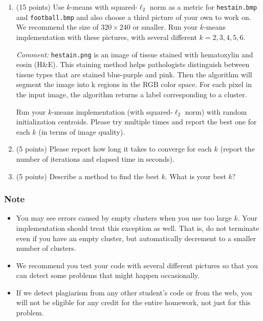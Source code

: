 \documentclass[twoside,10pt]{article}
\begin{document}
\begin{enumerate}
 
\item  (15 points) Use $k$-means with squared-$\ell_2$ norm as a metric for \texttt{hestain.bmp} and \texttt{football.bmp} and also choose a third picture of your own to work on. We recommend the size of $320 \times 240$ or smaller. Run your $k$-means implementation with these pictures, with several different $k = 2, 3, 4, 5, 6$. 
  
{\it Comment:}  \texttt{hestain.png} is an image of tissue stained with hematoxylin and eosin (H\&E). This staining method helps pathologists distinguish between tissue types that are stained blue-purple and pink. Then the algorithm will segment the image into k regions in the RGB color space. For each pixel in the input image, the algorithm returns a label corresponding to a cluster.
  
Run your $k$-means implementation (with squared-$\ell_2$ norm) with random initialization centroids. Please try multiple times and report the best one for each $k$ (in terms of image quality).
  
\item (5 points) Please  report how long it takes to converge for each $k$ (report the number of iterations and elapsed time in seconds).

\item (5 points) Describe a method to find the best $k$. What is your best $k$?

\end{enumerate}
  


\subsubsection*{Note}
\begin{itemize}
  \item You may see errors caused by empty clusters when you use too large $k$. Your implementation should treat this exception as well. That is, do not terminate even if you have an empty cluster, but automatically decrement to a smaller number of clusters.

  \item We recommend you test your code with several different pictures so that you can detect some problems that might happen occasionally. 

  \item If we detect plagiarism from any other student's code or from the web, you will not be eligible for any credit for the entire homework, not just for this problem.
\end{itemize}
\end{document}
